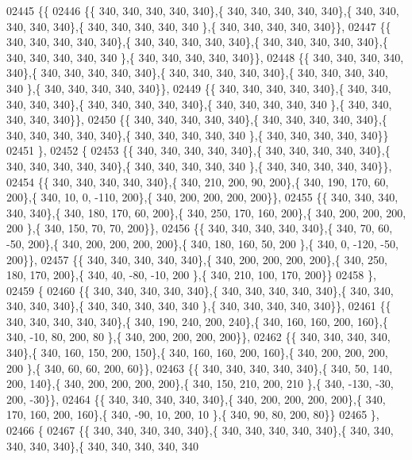 \begin{DoxyCode}
02445 \{\{
02446 \{\{ 340, 340, 340, 340, 340\},\{ 340, 340, 340, 340, 340\},\{ 340, 340, 340, 340, 340\},\{ 340, 340, 340, 340, 340
      \},\{ 340, 340, 340, 340, 340\}\},
02447 \{\{ 340, 340, 340, 340, 340\},\{ 340, 340, 340, 340, 340\},\{ 340, 340, 340, 340, 340\},\{ 340, 340, 340, 340, 340
      \},\{ 340, 340, 340, 340, 340\}\},
02448 \{\{ 340, 340, 340, 340, 340\},\{ 340, 340, 340, 340, 340\},\{ 340, 340, 340, 340, 340\},\{ 340, 340, 340, 340, 340
      \},\{ 340, 340, 340, 340, 340\}\},
02449 \{\{ 340, 340, 340, 340, 340\},\{ 340, 340, 340, 340, 340\},\{ 340, 340, 340, 340, 340\},\{ 340, 340, 340, 340, 340
      \},\{ 340, 340, 340, 340, 340\}\},
02450 \{\{ 340, 340, 340, 340, 340\},\{ 340, 340, 340, 340, 340\},\{ 340, 340, 340, 340, 340\},\{ 340, 340, 340, 340, 340
      \},\{ 340, 340, 340, 340, 340\}\}
02451 \},
02452 \{
02453 \{\{ 340, 340, 340, 340, 340\},\{ 340, 340, 340, 340, 340\},\{ 340, 340, 340, 340, 340\},\{ 340, 340, 340, 340, 340
      \},\{ 340, 340, 340, 340, 340\}\},
02454 \{\{ 340, 340, 340, 340, 340\},\{ 340, 210, 200,  90, 200\},\{ 340, 190, 170,  60, 200\},\{ 340,  10,   0, -110, 
      200\},\{ 340, 200, 200, 200, 200\}\},
02455 \{\{ 340, 340, 340, 340, 340\},\{ 340, 180, 170,  60, 200\},\{ 340, 250, 170, 160, 200\},\{ 340, 200, 200, 200, 200
      \},\{ 340, 150,  70,  70, 200\}\},
02456 \{\{ 340, 340, 340, 340, 340\},\{ 340,  70,  60, -50, 200\},\{ 340, 200, 200, 200, 200\},\{ 340, 180, 160,  50, 200
      \},\{ 340,   0, -120, -50, 200\}\},
02457 \{\{ 340, 340, 340, 340, 340\},\{ 340, 200, 200, 200, 200\},\{ 340, 250, 180, 170, 200\},\{ 340,  40, -80, -10, 200
      \},\{ 340, 210, 100, 170, 200\}\}
02458 \},
02459 \{
02460 \{\{ 340, 340, 340, 340, 340\},\{ 340, 340, 340, 340, 340\},\{ 340, 340, 340, 340, 340\},\{ 340, 340, 340, 340, 340
      \},\{ 340, 340, 340, 340, 340\}\},
02461 \{\{ 340, 340, 340, 340, 340\},\{ 340, 190, 240, 200, 240\},\{ 340, 160, 160, 200, 160\},\{ 340, -10,  80, 200,  80
      \},\{ 340, 200, 200, 200, 200\}\},
02462 \{\{ 340, 340, 340, 340, 340\},\{ 340, 160, 150, 200, 150\},\{ 340, 160, 160, 200, 160\},\{ 340, 200, 200, 200, 200
      \},\{ 340,  60,  60, 200,  60\}\},
02463 \{\{ 340, 340, 340, 340, 340\},\{ 340,  50, 140, 200, 140\},\{ 340, 200, 200, 200, 200\},\{ 340, 150, 210, 200, 210
      \},\{ 340, -130, -30, 200, -30\}\},
02464 \{\{ 340, 340, 340, 340, 340\},\{ 340, 200, 200, 200, 200\},\{ 340, 170, 160, 200, 160\},\{ 340, -90,  10, 200,  10
      \},\{ 340,  90,  80, 200,  80\}\}
02465 \},
02466 \{
02467 \{\{ 340, 340, 340, 340, 340\},\{ 340, 340, 340, 340, 340\},\{ 340, 340, 340, 340, 340\},\{ 340, 340, 340, 340, 340

\end{DoxyCode}
